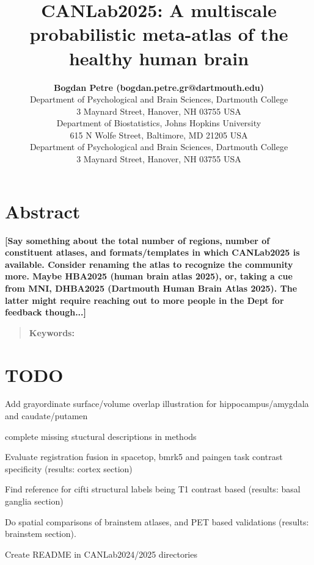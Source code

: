\documentclass[10pt,letterpaper]{article}
\title{CANLab2025: A multiscale probabilistic meta-atlas of the healthy human brain}
\author{{\large \bf Bogdan Petre (bogdan.petre.gr@dartmouth.edu)} \\
  Department of Psychological and Brain Sciences, Dartmouth College \\
  3 Maynard Street, Hanover, NH 03755 USA
\AND {\large \bf Martin A Lindquist (mlindqui@jhsph.edu)} \\
  Department of Biostatistics, Johns Hopkins University \\
  615 N Wolfe Street, Baltimore, MD 21205 USA
\AND {\large \bf Tor D Wager (tor.d.wager@dartmouth.edu)} \\
  Department of Psychological and Brain Sciences, Dartmouth College \\
  3 Maynard Street, Hanover, NH 03755 USA}
\begin{document}
\maketitle

\section{Abstract}
{
\bf
[Say something about the total number of regions, number of constituent atlases, and formats/templates in which CANLab2025 is available. Consider renaming the atlas to recognize the community more. Maybe HBA2025 (human brain atlas 2025), or, taking a cue from MNI, DHBA2025 (Dartmouth Human Brain Atlas 2025). The latter might require reaching out to more people in the Dept for feedback though...]
}
\begin{quote}
\small
\textbf{Keywords:}
\end{quote}

\section{TODO}
Add grayordinate surface/volume overlap illustration for hippocampus/amygdala and caudate/putamen

complete missing stuctural descriptions in methods

Evaluate registration fusion in spacetop, bmrk5 and paingen task contrast specificity (results: cortex section)

Find reference for cifti structural labels being T1 contrast based (results: basal ganglia section)

Do spatial comparisons of brainstem atlases, and PET based validations (results: brainstem section).

Create README in CANLab2024/2025 directories
\end{document}
